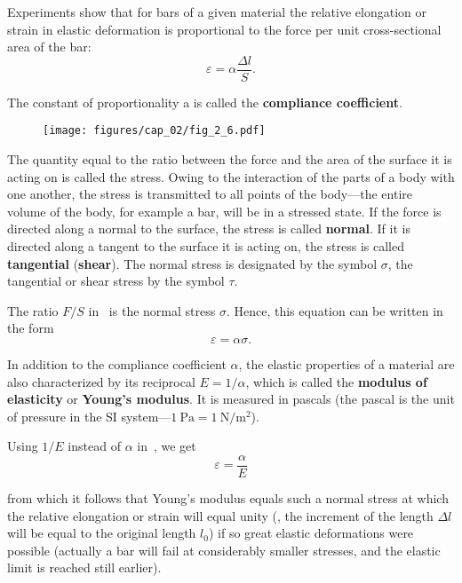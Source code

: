 Experiments show that for bars of a given material the relative elongation or strain in elastic deformation is proportional to the force per unit cross-sectional area of the bar:
\begin{equation}\label{eq:2_28}
\varepsilon = \alpha\frac{\Delta l}{S}.
\end{equation}

\noindent
The constant of proportionality a is called the \textbf{compliance coefficient}.

\begin{figure}[t]
	\begin{center}
		\texttt{[image: figures/cap\_02/fig\_2\_6.pdf]}
		\caption[]{}
		\label{fig:2_6}
	\end{center}
	\vspace{-0.7cm}
\end{figure}

The quantity equal to the ratio between the force and the area of the surface it is acting on is called the stress. Owing to the interaction of the parts of a body with one another, the stress is transmitted to all points of the body---the entire volume of the body, for example a bar, will be in a stressed state. If the force is directed along a normal to the surface, the stress is called \textbf{normal}. If it is directed along a tangent to the surface it is acting on, the stress is called \textbf{tangential} (\textbf{shear}). The normal stress is designated by the symbol $\sigma$, the tangential or shear stress by the symbol $\tau$.

The ratio $F/S$ in~ is the normal stress $\sigma$. Hence, this equation can be written in the form
\begin{equation}\label{eq:2_29}
\varepsilon = \alpha\sigma.
\end{equation}

\noindent
In addition to the compliance coefficient $\alpha$, the elastic properties of a material are also characterized by its reciprocal $E=1/\alpha$, which is called the \textbf{modulus of elasticity} or \textbf{Young's modulus}. It is measured in pascals (the pascal is the unit of pressure in the SI system---$\SI{1}{\pascal}=\SI{1}{\newton\per\square\metre}$).

Using $1/E$ instead of $\alpha$ in~, we get
\begin{equation}\label{eq:2_30}
\varepsilon = \frac{\alpha}{E}
\end{equation}

\noindent
from which it follows that Young's modulus equals such a normal stress at which the relative elongation or strain will equal unity (\ie, the increment of the length $\Delta l$ will be equal to the original length $l_0$) if so great elastic deformations were possible (actually a bar will fail at considerably smaller stresses, and the elastic limit is reached still earlier).

